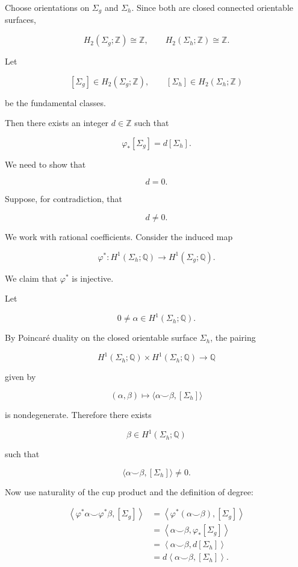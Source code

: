 \documentclass[12pt,a4paper]{article}
\theoremstyle{notespace}
\begin{document}
Choose orientations on \(\Sigma_g\) and \(\Sigma_h\). Since both are closed connected orientable surfaces,

\[
H_2(\Sigma_g;\mathbb Z)\cong \mathbb Z,
\qquad
H_2(\Sigma_h;\mathbb Z)\cong \mathbb Z.
\]

Let

\[
[\Sigma_g]\in H_2(\Sigma_g;\mathbb Z),
\qquad
[\Sigma_h]\in H_2(\Sigma_h;\mathbb Z)
\]

be the fundamental classes.

Then there exists an integer \(d\in \mathbb Z\) such that

\[
\varphi_*[\Sigma_g]=d[\Sigma_h].
\]

We need to show that

\[
d=0.
\]

Suppose, for contradiction, that

\[
d\neq 0.
\]

We work with rational coefficients. Consider the induced map

\[
\varphi^*:H^1(\Sigma_h;\mathbb Q)\longrightarrow H^1(\Sigma_g;\mathbb Q).
\]

We claim that \(\varphi^*\) is injective.

Let

\[
0\neq \alpha\in H^1(\Sigma_h;\mathbb Q).
\]

By Poincaré duality on the closed orientable surface \(\Sigma_h\), the pairing

\[
H^1(\Sigma_h;\mathbb Q)\times H^1(\Sigma_h;\mathbb Q)
\longrightarrow
\mathbb Q
\]

given by

\[
(\alpha,\beta)
\longmapsto
\langle \alpha\smile \beta,[\Sigma_h]\rangle
\]

is nondegenerate. Therefore there exists

\[
\beta\in H^1(\Sigma_h;\mathbb Q)
\]

such that

\[
\langle \alpha\smile \beta,[\Sigma_h]\rangle\neq 0.
\]

Now use naturality of the cup product and the definition of degree:

\[
\begin{aligned}
	\left\langle \varphi^*\alpha\smile \varphi^*\beta,[\Sigma_g]\right\rangle
	&=
	\left\langle \varphi^*(\alpha\smile \beta),[\Sigma_g]\right\rangle \\
	&=
	\left\langle \alpha\smile \beta,\varphi_*[\Sigma_g]\right\rangle \\
	&=
	\left\langle \alpha\smile \beta,d[\Sigma_h]\right\rangle \\
	&=
	d\left\langle \alpha\smile \beta,[\Sigma_h]\right\rangle.
\end{aligned}
\]
\end{document}
